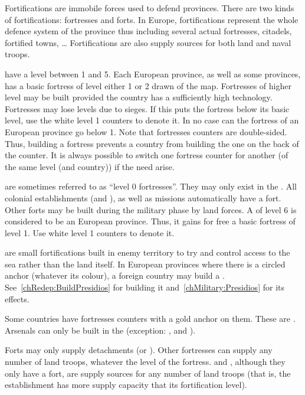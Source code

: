 \aparag Fortifications are immobile forces used to defend provinces. There are
two kinds of fortifications: fortresses and forts. In Europe, fortifications
represent the whole defence system of the province thus including several
actual fortresses, citadels, fortified towns, \ldots
\bparag Fortifications are also supply sources for both land and naval troops.

\aparag[Fortresses] have a level between 1 and 5.
\bparag Each European province, as well as some \ROTW provinces, has a basic
fortress of level either 1 or 2 drawn of the map.
\bparag Fortresses of higher level may be built provided the country has a
sufficiently high technology.
\bparag Fortresses may lose levels due to sieges. If this puts the fortress
below its basic level, use the white level 1 counters to denote it. In no case
can the fortress of an European province go below 1.
\bparag Note that fortresses counters are double-sided. Thus, building a
fortress prevents a country from building the one on the back of the
counter. It is always possible to switch one fortress counter for another (of
the same level (and country)) if the need arise.

\aparag[Forts] are sometimes referred to as ``level 0 fortresses''. They may
only exist in the \ROTW.
\bparag All colonial establishments (\COL and \TP), as well as missions
automatically have a fort.
\bparag Other forts may be built during the military phase by land forces.
\bparag A \COL of level 6 is considered to be an European province. Thus, it
gains for free a basic fortress of level 1. Use white level 1 counters to
denote it.

\aparag[\Presidios] are small fortifications built in enemy territory to try
and control access to the sea rather than the land itself.
\bparag In European provinces where there is a circled anchor (whatever its
colour), a foreign country may build a
\Presidio. See~\ref{chRedep:BuildPresidios} for building it
and~\ref{chMilitary:Presidios} for its effects.

\aparag[Arsenals.] Some countries have fortresses counters with a gold anchor
on them. These are .
\bparag Arsenals can only be built in the \ROTW (exception:
,  and
).

\bparag Forts may only supply detachments (\LD or \LDE).
\bparag Other fortresses can supply any number of land troops, whatever the
level of the fortress.
\bparag \COL and \TP, although they only have a fort, are supply sources for
any number of land troops (that is, the establishment has more supply capacity
that its fortification level).

